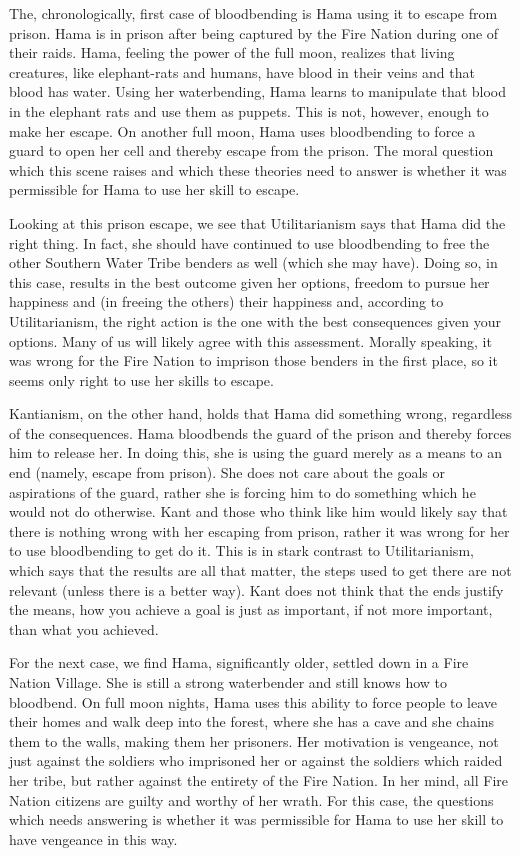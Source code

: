 The, chronologically, first case of bloodbending is Hama using it to escape from prison. Hama is in prison after being captured by the Fire Nation during one of their raids. Hama, feeling the power of the full moon, realizes that living creatures, like elephant-rats and humans, have blood in their veins and that blood has water. Using her waterbending, Hama learns to manipulate that blood in the elephant rats and use them as puppets. This is not, however, enough to make her escape. On another full moon, Hama uses bloodbending to force a guard to open her cell and thereby escape from the prison.\autocite[18:04-19:33]{puppetmaster} The moral question which this scene raises and which these theories need to answer is whether it was permissible for Hama to use her skill to escape.

Looking at this prison escape, we see that Utilitarianism says that Hama did the right thing. In fact, she should have continued to use bloodbending to free the other Southern Water Tribe benders as well (which she may have). Doing so, in this case, results in the best outcome given her options, freedom to pursue her happiness and (in freeing the others) their happiness and, according to Utilitarianism, the right action is the one with the best consequences given your options. Many of us will likely agree with this assessment. Morally speaking, it was wrong for the Fire Nation to imprison those benders in the first place, so it seems only right to use her skills to escape.

Kantianism, on the other hand, holds that Hama did something wrong, regardless of the consequences. Hama bloodbends the guard of the prison and thereby forces him to release her. In doing this, she is using the guard merely as a means to an end (namely, escape from prison). She does not care about the goals or aspirations of the guard, rather she is forcing him to do something which he would not do otherwise. Kant and those who think like him would likely say that there is nothing wrong with her escaping from prison, rather it was wrong for her to use bloodbending to get do it. This is in stark contrast to Utilitarianism, which says that the results are all that matter, the steps used to get there are not relevant (unless there is a better way). Kant does not think that the ends justify the means, how you achieve a goal is just as important, if not more important, than what you achieved.

For the next case, we find Hama, significantly older, settled down in a Fire Nation Village. She is still a strong waterbender and still knows how to bloodbend. On full moon nights, Hama uses this ability to force people to leave their homes and walk deep into the forest, where she has a cave and she chains them to the walls, making them her prisoners.\autocite[15:12-16:49, 17:10-18:03]{puppetmaster} Her motivation is vengeance, not just against the soldiers who imprisoned her or against the soldiers which raided her tribe, but rather against the entirety of the Fire Nation. In her mind, all Fire Nation citizens are guilty and worthy of her wrath. For this case, the questions which needs answering is whether it was permissible for Hama to use her skill to have vengeance in this way.


